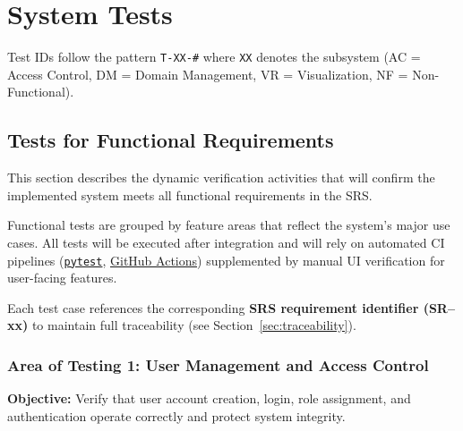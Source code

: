 \documentclass[12pt, titlepage]{article}
\begin{document}
\section{System Tests}
\label{sec:system-tests}
Test IDs follow the pattern \texttt{T-XX-\#} where \texttt{XX} denotes the
subsystem (AC = Access Control, DM = Domain Management, VR = Visualization,
NF = Non-Functional).

\subsection{Tests for Functional Requirements}
\label{subsec:functional-tests}

This section describes the dynamic verification activities that will confirm the implemented system meets all functional requirements in the SRS.

Functional tests are grouped by feature areas that reflect the system’s major use cases.
All tests will be executed after integration and will rely on automated CI pipelines
(\texttt{\href{https://requests-mock.readthedocs.io/en/latest/overview.html}{pytest}}, \href{https://github.com/thaafei/DomainX/actions}{GitHub Actions}) supplemented by manual UI verification for user-facing features.

Each test case references the corresponding \textbf{SRS requirement identifier (SR--xx)} to maintain full traceability (see Section~\ref{sec:traceability}).

\subsubsection{Area of Testing 1: User Management and Access Control}
\textbf{Objective:} Verify that user account creation, login, role assignment, and authentication operate correctly and protect system integrity.
\end{document}

